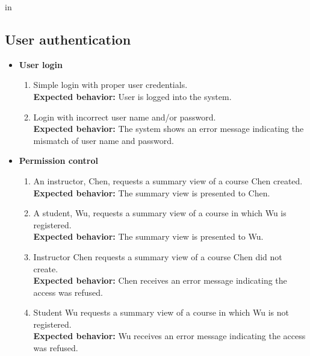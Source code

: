  in

\subsection{User authentication}
\begin{itemize}
    \item \textbf{User login} \begin{enumerate}
        \item Simple login with proper user credentials. \\
        \textbf{Expected behavior:} User is logged into the system.
        \item Login with incorrect user name and/or password. \\
        \textbf{Expected behavior:} The system shows an error message indicating
            the mismatch of user name and password.
    \end{enumerate}

    \item \textbf{Permission control} \begin{enumerate}
        \item An instructor, Chen, requests a
                summary view of a course Chen created. \\
        \textbf{Expected behavior:} The summary view is presented to Chen.

        \item A student, Wu, requests a summary
                view of a course in which Wu is registered. \\
        \textbf{Expected behavior:} The summary view is presented to Wu.

        \item Instructor Chen requests a summary view
                of a course Chen did not create. \\
        \textbf{Expected behavior:} Chen receives an error message indicating
            the access was refused.

        \item Student Wu requests a summary view
                of a course in which Wu is not registered. \\
        \textbf{Expected behavior:} Wu receives an error message
            indicating the access was refused.
    \end{enumerate}
\end{itemize}


